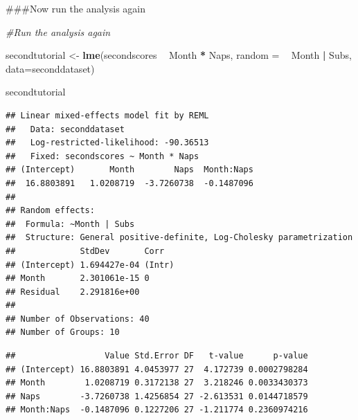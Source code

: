 \documentclass[]{book}
\newenvironment{Shaded}{\begin{snugshade}}{\end{snugshade}}
\newcommand{\CommentTok}[1]{\textcolor[rgb]{0.56,0.35,0.01}{\textit{#1}}}
\newcommand{\DataTypeTok}[1]{\textcolor[rgb]{0.13,0.29,0.53}{#1}}
\newcommand{\KeywordTok}[1]{\textcolor[rgb]{0.13,0.29,0.53}{\textbf{#1}}}
\newcommand{\NormalTok}[1]{#1}
\newcommand{\OperatorTok}[1]{\textcolor[rgb]{0.81,0.36,0.00}{\textbf{#1}}}
\newcommand{\StringTok}[1]{\textcolor[rgb]{0.31,0.60,0.02}{#1}}
\begin{document}
\#\#\#Now run the analysis again

\begin{Shaded}
\begin{Highlighting}[]
\CommentTok{#Run the analysis again }

\NormalTok{secondtutorial <-}\StringTok{ }\KeywordTok{lme}\NormalTok{(secondscores }\OperatorTok{~}\StringTok{ }\NormalTok{Month }\OperatorTok{*}\StringTok{ }\NormalTok{Naps, }\DataTypeTok{random =} \OperatorTok{~}\StringTok{ }\NormalTok{Month }\OperatorTok{|}\StringTok{ }\NormalTok{Subs, }\DataTypeTok{data=}\NormalTok{seconddataset)}

\NormalTok{secondtutorial}
\end{Highlighting}
\end{Shaded}

\begin{verbatim}
## Linear mixed-effects model fit by REML
##   Data: seconddataset 
##   Log-restricted-likelihood: -90.36513
##   Fixed: secondscores ~ Month * Naps 
## (Intercept)       Month        Naps  Month:Naps 
##  16.8803891   1.0208719  -3.7260738  -0.1487096 
## 
## Random effects:
##  Formula: ~Month | Subs
##  Structure: General positive-definite, Log-Cholesky parametrization
##             StdDev       Corr  
## (Intercept) 1.694427e-04 (Intr)
## Month       2.301061e-15 0     
## Residual    2.291816e+00       
## 
## Number of Observations: 40
## Number of Groups: 10
\end{verbatim}

\begin{Shaded}
\end{Shaded}

\begin{verbatim}
##                  Value Std.Error DF   t-value      p-value
## (Intercept) 16.8803891 4.0453977 27  4.172739 0.0002798284
## Month        1.0208719 0.3172138 27  3.218246 0.0033430373
## Naps        -3.7260738 1.4256854 27 -2.613531 0.0144718579
## Month:Naps  -0.1487096 0.1227206 27 -1.211774 0.2360974216
\end{verbatim}
\end{document}
